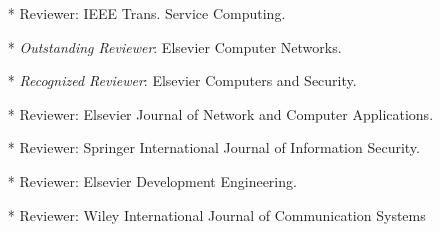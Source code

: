 \begin{itemize}
\begin{itemize}
	\item[*] Reviewer: IEEE Trans. Service Computing.
	
	\item[*] \textit{ Outstanding Reviewer}: Elsevier Computer Networks.

	\item[*] \textit{Recognized Reviewer}: Elsevier Computers and Security.

	\item[*] Reviewer: Elsevier Journal of Network and Computer Applications.
	
	\item[*] Reviewer: Springer International Journal of Information Security.
	
	\item[*] Reviewer: Elsevier Development Engineering. 
	
	\item[*] Reviewer: Wiley International Journal of Communication Systems

	
	\end{itemize}
	
	
		\end{itemize}